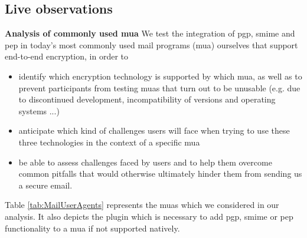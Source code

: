 \subsection{Live observations}
\textbf{\newline Analysis of commonly used \acrlong{mua}}
\newline
We test the integration of \acrshort{pgp}, \acrshort{smime} and \acrshort{pep} in today's most commonly used mail programs (\acrshort{mua}) ourselves that support end-to-end encryption, in order to
\begin{itemize}
	\item identify which encryption technology is supported by which \acrshort{mua}, as well as to prevent participants from testing \acrshort{mua}s that turn out to be unusable (e.g. due to discontinued development, incompatibility of versions and operating systems ...)
	\item anticipate which kind of challenges users will face when trying to use these three technologies in the context of a specific \acrshort{mua}
	\item be able to assess challenges faced by users and to help them overcome common pitfalls that would otherwise ultimately hinder them from sending us a secure \acrshort{email}.
\end{itemize}
Table \ref{tab:MailUserAgents} represents the \acrlong{mua}s which we considered in our analysis. It also depicts the plugin which is necessary to add \acrshort{pgp}, \acrshort{smime} or \acrshort{pep} functionality to a \acrshort{mua} if not	supported natively.
